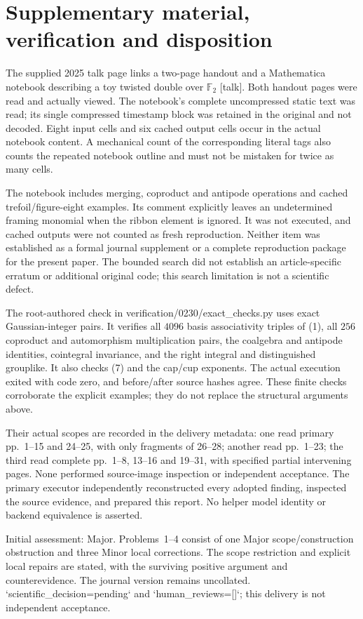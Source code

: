 \documentclass[10pt]{article}
\begin{document}
\section*{Supplementary material, verification and disposition}
The supplied 2025 talk page links a two-page handout and a Mathematica notebook describing a toy twisted double over \(\mathbb F_2\) [talk]. Both handout pages were read and actually viewed. The notebook’s complete uncompressed static text was read; its single compressed timestamp block was retained in the original and not decoded. Eight input cells and six cached output cells occur in the actual notebook content. A mechanical count of the corresponding literal tags also counts the repeated notebook outline and must not be mistaken for twice as many cells.\par
The notebook includes merging, coproduct and antipode operations and cached trefoil/figure-eight examples. Its comment explicitly leaves an undetermined framing monomial when the ribbon element is ignored. It was not executed, and cached outputs were not counted as fresh reproduction. Neither item was established as a formal journal supplement or a complete reproduction package for the present paper. The bounded search did not establish an article-specific erratum or additional original code; this search limitation is not a scientific defect.\par
The root-authored check in verification/0230/exact\_checks.py uses exact Gaussian-integer pairs. It verifies all \(4096\) basis associativity triples of (1), all \(256\) coproduct and automorphism multiplication pairs, the coalgebra and antipode identities, cointegral invariance, and the right integral and distinguished grouplike. It also checks (7) and the cap/cup exponents. The actual execution exited with code zero, and before/after source hashes agree. These finite checks corroborate the explicit examples; they do not replace the structural arguments above.\par
Their actual scopes are recorded in the delivery metadata: one read primary pp. 1–15 and 24–25, with only fragments of 26–28; another read pp. 1–23; the third read complete pp. 1–8, 13–16 and 19–31, with specified partial intervening pages. None performed source-image inspection or independent acceptance. The primary executor independently reconstructed every adopted finding, inspected the source evidence, and prepared this report. No helper model identity or backend equivalence is asserted.\par
Initial assessment: Major. Problems 1–4 consist of one Major scope/construction obstruction and three Minor local corrections. The scope restriction and explicit local repairs are stated, with the surviving positive argument and counterevidence. The journal version remains uncollated. `scientific\_decision=pending` and `human\_reviews=[]`; this delivery is not independent acceptance.\par
\end{document}
